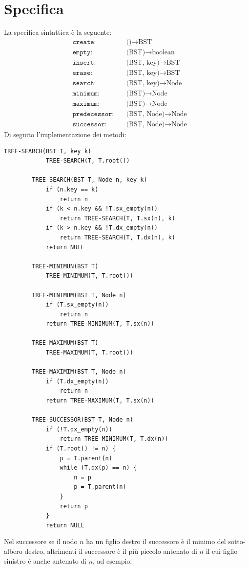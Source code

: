 \documentclass[12pt]{report}
\begin{document}
  	\section{Specifica}
  	La specifica sintattica è la seguente:
  	  	\begin{align*}
  		&\texttt{create}: &\quad \text{()} \to \text{BST} \\
  		&\texttt{empty:} &\quad \text{(BST)}  \to \text{boolean}  \\
  		&\texttt{insert:} &\quad \text{(BST, key)}  \to \text{BST}  \\
  		&\texttt{erase:} &\quad \text{(BST, key)}  \to \text{BST}   \\
  		&\texttt{search:} &\quad \text{(BST, key)}  \to \text{Node} \\
  		&\texttt{minimum:} &\quad \text{(BST)} \to \text{Node} \\
  		&\texttt{maximum:} &\quad \text{(BST)} \to \text{Node} \\
  		&\texttt{predecessor:} &\quad \text{(BST, Node)} \to \text{Node} \\
  		&\texttt{successor:} &\quad \text{(BST, Node)} \to \text{Node}
  	\end{align*}
  	Di seguito l'implementazione dei metodi:
  	\begin{lstlisting}[style=pascalstyle]
  		TREE-SEARCH(BST T, key k)
  			TREE-SEARCH(T, T.root())

  		TREE-SEARCH(BST T, Node n, key k)
  			if (n.key == k)
  				return n
  			if (k < n.key && !T.sx_empty(n))
  				return TREE-SEARCH(T, T.sx(n), k)
  			if (k > n.key && !T.dx_empty(n))
  				return TREE-SEARCH(T, T.dx(n), k)
  			return NULL

  		TREE-MINIMUN(BST T)
  			TREE-MINIMUM(T, T.root())

  		TREE-MINIMUM(BST T, Node n)
  			if (T.sx_empty(n))
  				return n
  			return TREE-MINIMUM(T, T.sx(n))

  		TREE-MAXIMUM(BST T)
  			TREE-MAXIMUM(T, T.root())

  		TREE-MAXIMIM(BST T, Node n)
  			if (T.dx_empty(n))
  				return n
  			return TREE-MAXIMUM(T, T.sx(n))

  		TREE-SUCCESSOR(BST T, Node n)
  			if (!T.dx_empty(n))
  				return TREE-MINIMUM(T, T.dx(n))
  			if (T.root() != n) {
  				p = T.parent(n)
  				while (T.dx(p) == n) {
  					n = p
  					p = T.parent(n)
  				}
  				return p
  			}
  			return NULL
  	\end{lstlisting}
  	Nel successore se il nodo $n$ ha un figlio destro il successore è il minimo del sotto-albero destro, altrimenti il successore è il più piccolo antenato di $n$ il cui figlio sinistro è anche antenato di $n$, ad esempio:
\end{document}
